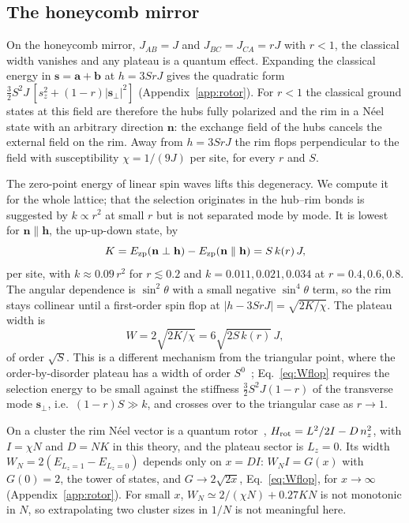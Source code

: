 \documentclass[prb,twocolumn,superscriptaddress,amsmath,amssymb,floatfix]{revtex4-2}
\begin{document}
\subsection{The honeycomb mirror}
On the honeycomb mirror, $J_{AB}=J$ and $J_{BC}=J_{CA}=rJ$ with $r<1$, the classical width vanishes and any plateau is a quantum effect. Expanding the classical energy in $\mathbf s=\mathbf a+\mathbf b$ at $h=3SrJ$ gives the quadratic form $\tfrac32S^2J\,[s_z^2+(1-r)|\mathbf s_\perp|^2]$ (Appendix~\ref{app:rotor}). For $r<1$ the classical ground states at this field are therefore the hubs fully polarized and the rim in a N\'eel state with an arbitrary direction $\mathbf n$: the exchange field of the hubs cancels the external field on the rim. Away from $h=3SrJ$ the rim flops perpendicular to the field with susceptibility $\chi=1/(9J)$ per site, for every $r$ and $S$.

The zero-point energy of linear spin waves lifts this degeneracy. We compute it for the whole lattice; that the selection originates in the hub--rim bonds is suggested by $k\propto r^2$ at small $r$ but is not separated mode by mode. It is lowest for $\mathbf n\parallel\mathbf h$, the up-up-down state, by
\begin{equation}
K=E_{\rm zp}(\mathbf n\perp\mathbf h)-E_{\rm zp}(\mathbf n\parallel\mathbf h)=S\,k(r)\,J,
\label{eq:K}
\end{equation}
per site, with $k\approx0.09\,r^2$ for $r\lesssim0.2$ and $k=0.011,0.021,0.034$ at $r=0.4,0.6,0.8$. The angular dependence is $\sin^2\theta$ with a small negative $\sin^4\theta$ term, so the rim stays collinear until a first-order spin flop at $|h-3SrJ|=\sqrt{2K/\chi}$. The plateau width is
\begin{equation}
W=2\sqrt{2K/\chi}=6\sqrt{2S\,k(r)}\,J,
\label{eq:Wflop}
\end{equation}
of order $\sqrt S$. This is a different mechanism from the triangular point, where the order-by-disorder plateau has a width of order $S^0$~\cite{ChubukovGolosov1991}; Eq.~\eqref{eq:Wflop} requires the selection energy to be small against the stiffness $\tfrac32S^2J(1-r)$ of the transverse mode $\mathbf s_\perp$, i.e.\ $(1-r)S\gg k$, and crosses over to the triangular case as $r\to1$.

On a cluster the rim N\'eel vector is a quantum rotor~\cite{Bernu1994}, $H_{\rm rot}=L^2/2I-D\,n_z^2$, with $I=\chi N$ and $D=NK$ in this theory, and the plateau sector is $L_z=0$. Its width $W_N=2(E_{L_z=1}-E_{L_z=0})$ depends only on $x=DI$: $W_NI=G(x)$ with $G(0)=2$, the tower of states, and $G\to2\sqrt{2x}$, Eq.~\eqref{eq:Wflop}, for $x\to\infty$ (Appendix~\ref{app:rotor}). For small $x$, $W_N\simeq2/(\chi N)+0.27KN$ is not monotonic in $N$, so extrapolating two cluster sizes in $1/N$ is not meaningful here.
\end{document}
